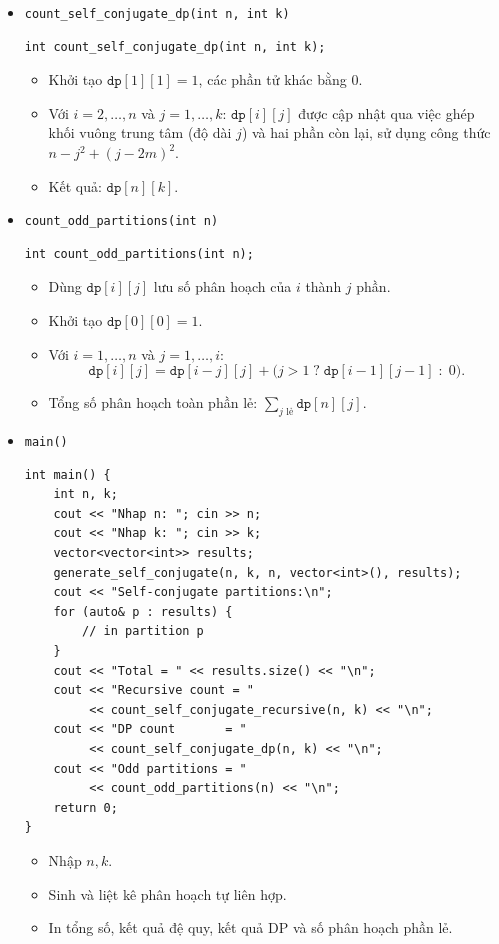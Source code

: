 \documentclass[a4paper,12pt]{article}
\begin{document}
\begin{itemize}
  \item \texttt{count\_self\_conjugate\_dp(int n, int k)}  
    \begin{lstlisting}[style=cppstyle]
int count_self_conjugate_dp(int n, int k);
    \end{lstlisting}
    \begin{itemize}
      \item Khởi tạo \(\texttt{dp}[1][1]=1\), các phần tử khác bằng 0.  
      \item Với \(i=2,\dots,n\) và \(j=1,\dots,k\):  
        \(\texttt{dp}[i][j]\) được cập nhật qua việc ghép khối vuông trung tâm (độ dài \(j\)) và hai phần còn lại, sử dụng công thức \(n - j^2 + (j-2m)^2\).  
      \item Kết quả: \(\texttt{dp}[n][k]\).
    \end{itemize}

  \item \texttt{count\_odd\_partitions(int n)}  
    \begin{lstlisting}[style=cppstyle]
int count_odd_partitions(int n);
    \end{lstlisting}
    \begin{itemize}
      \item Dùng \(\texttt{dp}[i][j]\) lưu số phân hoạch của \(i\) thành \(j\) phần.  
      \item Khởi tạo \(\texttt{dp}[0][0]=1\).  
      \item Với \(i=1,\dots,n\) và \(j=1,\dots,i\):
        \[
          \texttt{dp}[i][j]
            = \texttt{dp}[i-j][j]
            + \bigl(j>1\;?\;\texttt{dp}[i-1][j-1]\;:\;0\bigr).
        \]
      \item Tổng số phân hoạch toàn phần lẻ: \(\sum_{j\text{ lẻ}}\texttt{dp}[n][j]\).
    \end{itemize}

  \item \texttt{main()}  
    \begin{lstlisting}[style=cppstyle]
int main() {
    int n, k;
    cout << "Nhap n: "; cin >> n;
    cout << "Nhap k: "; cin >> k;
    vector<vector<int>> results;
    generate_self_conjugate(n, k, n, vector<int>(), results);
    cout << "Self-conjugate partitions:\n";
    for (auto& p : results) {
        // in partition p
    }
    cout << "Total = " << results.size() << "\n";
    cout << "Recursive count = "
         << count_self_conjugate_recursive(n, k) << "\n";
    cout << "DP count       = "
         << count_self_conjugate_dp(n, k) << "\n";
    cout << "Odd partitions = "
         << count_odd_partitions(n) << "\n";
    return 0;
}
    \end{lstlisting}
    \begin{itemize}
      \item Nhập \(n, k\).  
      \item Sinh và liệt kê phân hoạch tự liên hợp.  
      \item In tổng số, kết quả đệ quy, kết quả DP và số phân hoạch phần lẻ.
    \end{itemize}

\end{itemize}
\end{document}
